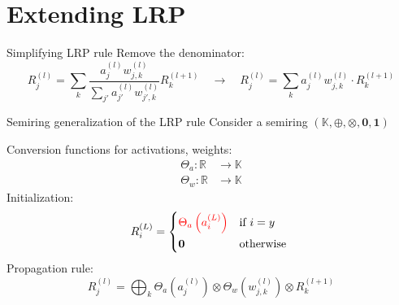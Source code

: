 \documentclass[aspectratio=169]{beamer}
\theoremstyle{definition}
\begin{document}
\section{Extending LRP}
\begin{frame}{Simplifying LRP rule}
    Remove the denominator:
    \begin{equation*}
        R^{(l)}_j = \sum_k\frac{a^{(l)}_jw_{j, k}^{(l)}}{\sum_{j'}a^{(l)}_{j'}w_{j', k}^{(l)}} R^{(l+1)}_k \quad \longrightarrow \quad R^{(l)}_j = \sum_{k} a^{(l)}_jw_{j, k}^{(l)} \cdot R^{(l+1)}_k
    \end{equation*}
\end{frame}

\begin{frame}{Semiring generalization of the LRP rule}
    Consider a semiring $(\mathbb{K}, \oplus, \otimes, \mathbf{0}, \mathbf{1})$

    Conversion functions for activations, weights:
    \begin{equation*}
        \begin{aligned}
            \Theta_a : \mathbb{R} \!\!&\longrightarrow \mathbb{K}\\
            \Theta_w : \mathbb{R} &\longrightarrow \mathbb{K}
        \end{aligned}
    \end{equation*}
    Initialization:
    \begin{equation}
        R^{(L)}_i = \begin{cases*}
            \textcolor{red}{\Theta_a\left(a^{(L)}_i\right)} & if $i = y$\\
            \mathbf{0} & otherwise
        \end{cases*}
    \end{equation}
    Propagation rule:
    \begin{equation}
        R^{(l)}_j = \bigoplus_k \Theta_a\left(a^{(l)}_j\right) \otimes \Theta_w\left(w_{j, k}^{(l)}\right) \otimes R^{(l+1)}_k
    \end{equation}
\end{frame}
\end{document}
